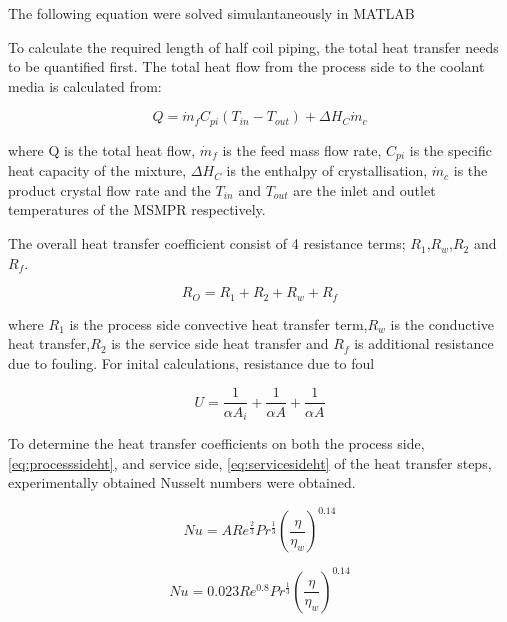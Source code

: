 The following equation were solved simulantaneously in MATLAB 


To calculate the required length of half coil piping, the total heat transfer needs to be quantified first. The total heat flow from the process side to the coolant media is calculated from:

\begin{equation} \label{eq:energy balance}
    Q =  \Dot{m}_{f}C_{pi}(T_{in}-T_{out})+ \Delta H_{C}\Dot{m}_{c}
\end{equation}

\noindent where Q is the total heat flow, $\Dot{m}_f$ is the feed mass flow rate, $C_{pi}$ is the specific heat capacity of the mixture, $\Delta H_{C}$ is the enthalpy of crystallisation, $\Dot{m}_{c}$ is the product crystal flow rate and the $T_{in}$ and $T_{out}$ are the inlet and outlet temperatures of the MSMPR respectively.


The overall heat transfer coefficient consist of 4 resistance terms; $R_1$,$R_w$,$R_2$ and $R_f$.

\begin{equation} \label{eq:resistht}
    R_O = R_1 + R_2 + R_w + R_f
\end{equation}

where $R_1$ is the process side convective heat transfer term,$R_w$ is the conductive heat transfer,$R_2$ is the service side heat transfer and $R_f$ is additional resistance due to fouling. For inital calculations, resistance due to foul

\begin{equation} \label{eq:energy balance}
    U = \frac{1}{\alpha A_i} + \frac{1}{\alpha A} + \frac{1}{\alpha A}
\end{equation}




To determine the heat transfer coefficients on both the process side,\ref{eq:processsideht},  and service side, \ref{eq:servicesideht} of the heat transfer steps, experimentally obtained Nusselt numbers were obtained. 


\begin{equation} \label{eq:processsideht}
    Nu = ARe^{\frac{2}{3}}Pr^{\frac{1}{3}}\left( \frac{\eta}{\eta_w} \right)^{0.14}
\end{equation}

\begin{equation} \label{eq:servicesideht}
    Nu = 0.023Re^{0.8}Pr^{\frac{1}{3}} \left( \frac{\eta}{\eta_w} \right)^{0.14}
\end{equation}



